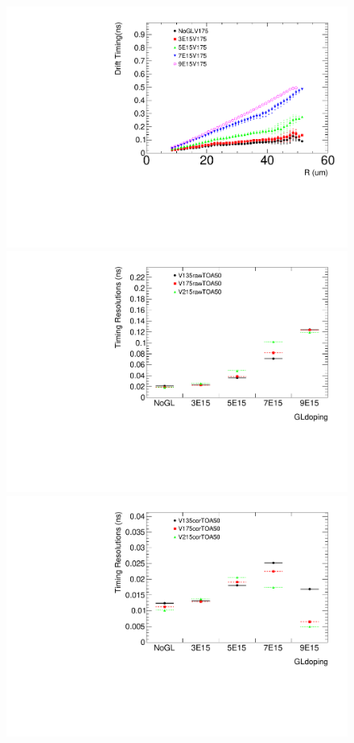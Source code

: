 \documentclass[aps,pt14,superscriptaddress,floatfix,nofootinbib]{revtex4}
\begin{document}
\begin{figure}[hbtp]
\begin{center}
\includegraphics[width=0.25\textheight,keepaspectratio]{figures/Anatiming_timing3DIBLGAD5E_Plots_V175.pdf}
\includegraphics[width=0.25\textheight,keepaspectratio]{figures/Anatiming_timing3DIBLGAD5E_Plots_rawTOA50GLdoping.pdf}
\includegraphics[width=0.25\textheight,keepaspectratio]{figures/Anatiming_timing3DIBLGAD5E_Plots_corTOA50GLdoping.pdf}

\end{center}
\end{figure}
\end{document}
